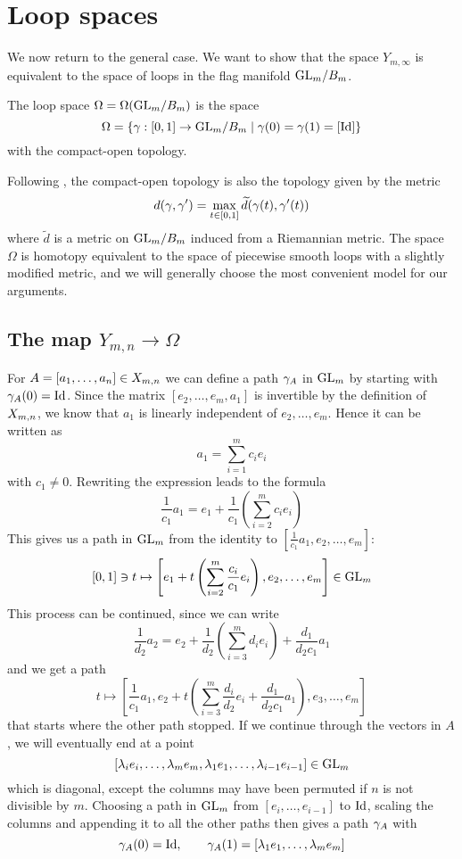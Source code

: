 \chapter{Loop spaces}

We now return to the general case. We want to show that the space
$Y_{m,\infty}$ is equivalent to the space of loops in the flag
manifold $\mathrm{GL}_{m}/B_{m}$.

\begin{definition}
  The loop space $\Omega = \Omega(\mathrm{GL}_{m}/B_{m})$ is the space
  \[ \Omega = \left\{ \gamma : [0,1] \to \mathrm{GL}_{m}/B_{m} \mid \gamma(0) = \gamma(1) =
    [\operatorname{Id}] \right\} \]
  with the compact-open topology. 
\end{definition}

\begin{remark}
  Following \cite[Chapter 17]{milnor}, the compact-open topology is
  also the topology given by the metric
  \[ d(\gamma,\gamma') = \max_{t\in[0,1]} \widetilde d (\gamma(t),\gamma'(t)) \]
  where $\widetilde d$ is a metric on $\mathrm{GL}_{m}/B_{m}$ induced from a
  Riemannian metric. The space $\Omega$ is homotopy equivalent to the
  space of piecewise smooth loops with a slightly modified metric, and
  we will generally choose the most convenient model for our
  arguments.
\end{remark}

\section{The map $Y_{m,n}\to\Omega$}

For $A = [a_1,\dots,a_n]\in X_{m,n}$ we
can define a path $ \gamma_A$ in $\mathrm{GL}_m$ by starting with
$\gamma_A(0) = \operatorname{Id}$. Since the matrix $[e_2,\dots,e_m,a_1]$ is
invertible by the definition of $X_{m,n}$, we know that $a_1$ is linearly
independent of $e_2,\dots,e_m$. Hence it can be written as
\[ a_1 = \sum_{i=1}^m c_i e_i \]
with $c_1 \neq 0$. Rewriting the expression leads to the formula
\[  \frac{1}{c_1} a_1= e_1 + \frac{1}{c_1} \left(\sum_{i=2}^m c_i
  e_i\right) \]
This gives us a path in $\mathrm{GL}_m$ from the identity to
$\left[\frac{1}{c_1} a_1,e_2,\dots,e_m\right]$:
\[ [0,1]\ni t \mapsto \left[ e_1 + t\left(\sum_{i=2}^m
    \frac{c_i}{c_1}e_i\right),e_2,\dots,e_m \right] \in \mathrm{GL}_m \]
This process can be continued, since we can write
\[ \frac{1}{d_2}a_2 = e_2 + \frac{1}{d_2}\left(\sum_{i=3}^m d_i
  e_i\right) + \frac{d_1}{d_2c_1}a_1 \]
and we get a path
\[ t\mapsto \left[\frac{1}{c_1}a_1,e_2+t\left(\sum_{i=3}^m
    \frac{d_i}{d_2}e_i +
    \frac{d_1}{d_2c_1}a_1\right),e_3,\dots,e_m\right] \]
that starts where the other path stopped. If we continue through the
vectors in $A$, we will eventually end at a point
\[ [\lambda_i e_i,\dots,\lambda_me_m,\lambda_1e_1,\dots,\lambda_{i-1}e_{i-1}]\in \mathrm{GL}_m \]
which is diagonal, except the columns may have been
permuted if $n$ is not divisible by $m$. Choosing a path in $\mathrm{GL}_m$
from $[e_i,\dots,e_{i-1}]$ to $\operatorname{Id}$, scaling the columns and appending
it to all the other paths then gives a path $ \gamma_A$ with
\[  \gamma_A(0) = \operatorname{Id}, \qquad \gamma_A(1) =
[\lambda_1e_1,\dots,\lambda_me_m] \]

